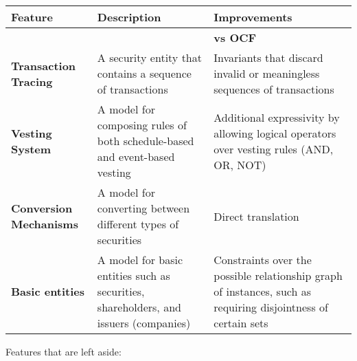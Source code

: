 \begin{tabular}{|p{5cm}|p{5cm}|p{5cm}|}
\hline
\textbf{Feature}               & \textbf{Description}                                                                 & \textbf{Improvements}                                                                                         \\
\hline
                               &                                                                                      & \textbf{vs OCF}                                                                                               \\
\hline
\textbf{Transaction Tracing}   & A security entity that contains a sequence of transactions                           & Invariants that discard invalid or meaningless sequences of transactions                                      \\
\hline
\textbf{Vesting System}        & A model for composing rules of both schedule-based and event-based vesting           & Additional expressivity by allowing logical operators over vesting rules (AND, OR, NOT)                       \\
\hline
\textbf{Conversion Mechanisms} & A model for converting between different types of securities                         & Direct translation                                                                                            \\
\hline
\textbf{Basic entities}        & A model for basic entities such as securities, shareholders, and issuers (companies) & Constraints over the possible relationship graph of instances, such as requiring disjointness of certain sets \\
\hline
\end{tabular}

Features that are left aside:

